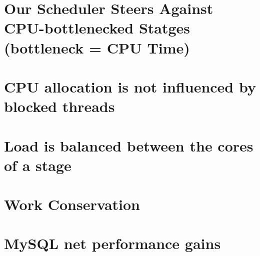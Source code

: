 \documentclass[12pt,a4paper]{book}
\begin{document}
\section{Our Scheduler Steers Against CPU-bottlenecked Statges (bottleneck = CPU Time)}

\section{CPU allocation is not influenced by blocked threads}

\section{Load is balanced between the cores of a stage}

\section{Work Conservation}

\section{MySQL net performance gains}
\end{document}
